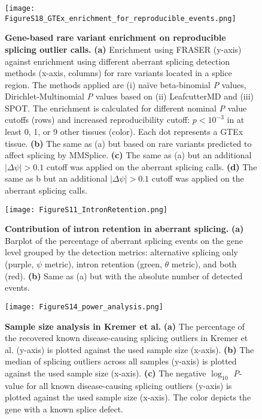 \documentclass[a4paper,12pt]{article}
\begin{document}
\begin{figure}[h]
\centering
	\texttt{[image: FigureS18\_GTEx\_enrichment\_for\_reproducible\_events.png]}
	\caption{
	    \textbf{Gene-based rare variant enrichment on reproducible splicing outlier calls.}
	    \textbf{(a)} Enrichment using FRASER (y-axis) against enrichment using
different aberrant splicing detection methods (x-axis, columns) for rare variants
located in a splice region. The methods applied are (i) na\"ive beta-binomial 
\textit{P} values, Dirichlet-Multinomial \textit{P} values based on 
(ii) LeafcutterMD and (iii) SPOT. The enrichment is calculated for different 
nominal \textit{P} value cutoffs (rows) and increased reproducibility cutoff: 
$p < 10^{-3}$ in at least 0, 1, or 9 other tissues (color).
Each dot represents a GTEx tissue. \textbf{(b)} The same as (a) but based on rare 
variants predicted to affect splicing by MMSplice.
\textbf{(c)} The same as (a) but an additional $|\Delta\psi| > 0.1$ cutoff was
applied on the aberrant splicing calls. \textbf{(d)} The same
as b but an additional $|\Delta\psi| > 0.1$ cutoff was applied on the aberrant 
splicing calls.
}
\end{figure}
\pagebreak

\begin{figure}[h]
\centering
	\texttt{[image: FigureS11\_IntronRetention.png]}
	\caption{
	    \textbf{Contribution of intron retention in aberrant splicing.}
\textbf{(a)} Barplot of the percentage of aberrant splicing events on the gene level
grouped by the detection metrics: alternative splicing only (purple, $\psi$ metric), 
intron retention (green, $\theta$ metric), and both (red). \textbf{(b)} Same as (a)
but with the absolute number of detected events.
}
\end{figure}
\pagebreak


\begin{figure}[h]
\centering
	\texttt{[image: FigureS14\_power\_analysis.png]}
	\caption{
	    \textbf{Sample size analysis in Kremer et al.}
\textbf{(a)} The percentage of the recovered known disease-causing splicing 
outliers in Kremer et al. (y-axis) is plotted against the used sample size (x-axis). 
\textbf{(b)} The median of splicing outliers across all samples (y-axis) is plotted
against the used sample size (x-axis).
\textbf{(c)} The negative $\log_{10}$ \textit{P}-value for all known disease-causing
splicing outliers (y-axis) is plotted against the used sample size (x-axis). 
The color depicts the gene with a known splice defect.
}
\end{figure}
\pagebreak
\end{document}
